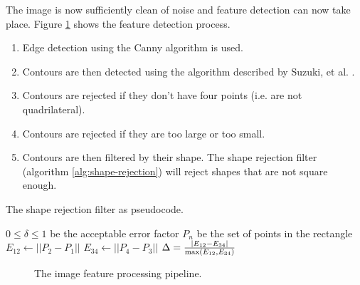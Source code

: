 \documentclass[conference]{IEEEtran}
\begin{document}
The image is now sufficiently clean of noise and feature detection can now take place.
Figure \ref{fig:feature-detection} shows the feature detection process.
\begin{enumerate}
	\item Edge detection using the Canny \cite{Canny1986} algorithm is used. %
	\item Contours are then detected using the algorithm described by Suzuki, et al. \cite{Suzuki1985}.
	\item Contours are rejected if they don't have four points (i.e. are not quadrilateral).
	\item Contours are rejected if they are too large or too small.
	\item Contours are then filtered by their shape. The shape rejection filter (algorithm \ref{alg:shape-rejection}) will reject shapes that are not square enough.
\end{enumerate}
\begin{algorithm}
	\caption{The shape rejection filter as pseudocode.}
	\label{alg:shape-rejection}
	\begin{algorithmic}
		\REQUIRE $0 \leq \delta \leq 1$ be the acceptable error factor
		\REQUIRE $P_n$ be the set of points in the rectangle
		\STATE $E_{12} \leftarrow ||P_2 - P_1||$
		\STATE $E_{34} \leftarrow ||P_4 - P_3||$
		\STATE $\Delta = \frac{|E_{12} - E_{34}|}{\textnormal{max}(E_{12}, E_{34})}$
		\IF {$\Delta \leq \delta$} \RETURN \TRUE \ELSE \RETURN \FALSE \ENDIF
	\end{algorithmic}
\end{algorithm}
\begin{figure}
	\centering
	\caption{The image feature processing pipeline.}
	\label{fig:feature-detection}
\end{figure}
\end{document}
